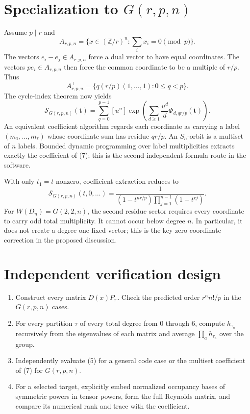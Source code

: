 \documentclass[11pt]{article}
\newcommand{\Sfun}{\mathcal S}
\begin{document}
\section{Specialization to $G(r,p,n)$}

Assume $p\mid r$ and
\[
A_{r,p,n}=\{x\in(\mathbb Z/r)^n:\sum_i x_i=0\pmod p\}.
\]
The vectors $e_i-e_j\in A_{r,p,n}$ force a dual vector to have equal
coordinates.  The vectors $p e_i\in A_{r,p,n}$ then force the common coordinate
to be a multiple of $r/p$.  Thus
\begin{equation}
A_{r,p,n}^\perp
=\{q(r/p)(1,\ldots,1):0\leq q<p\}.                            \tag{6}
\end{equation}
The cycle-index theorem now yields
\begin{equation}
\Sfun_{G(r,p,n)}(\mathbf t)
=\sum_{q=0}^{p-1}[u^n]\exp\left(
\sum_{d\geq1}\frac{u^d}{d}\Phi_{d,qr/p}(\mathbf t)\right).  \tag{7}
\end{equation}
An equivalent coefficient algorithm regards each coordinate as carrying a
label $(m_1,\ldots,m_\ell)$ whose coordinate sum has residue $qr/p$.  An
$S_n$-orbit is a multiset of $n$ labels.  Bounded dynamic programming over
label multiplicities extracts exactly the coefficient of (7); this is the
second independent formula route in the software.

With only $t_1=t$ nonzero, coefficient extraction reduces to
\begin{equation}
\Sfun_{G(r,p,n)}(t,0,\ldots)=
\frac1{(1-t^{nr/p})\prod_{j=1}^{n-1}(1-t^{rj})}.              \tag{8}
\end{equation}
For $W(D_n)=G(2,2,n)$, the second residue sector requires every coordinate to
carry odd total multiplicity.  It cannot occur below degree $n$.  In
particular, it does not create a degree-one fixed vector; this is the key
zero-coordinate correction in the proposed discussion.

\section{Independent verification design}

\begin{enumerate}[leftmargin=*,itemsep=3pt]
\item Construct every matrix $D(x)P_\pi$.  Check the predicted order
$r^n n!/p$ in the $G(r,p,n)$ cases.
\item For every partition $\tau$ of every total degree from $0$ through $6$,
compute $h_{\tau_a}$ recursively from the eigenvalues of each matrix and
average $\prod_a h_{\tau_a}$ over the group.
\item Independently evaluate (5) for a general code case or the multiset
coefficient of (7) for $G(r,p,n)$.
\item For a selected target, explicitly embed normalized occupancy bases of
symmetric powers in tensor powers, form the full Reynolds matrix, and compare
its numerical rank and trace with the coefficient.
\end{enumerate}
\end{document}

